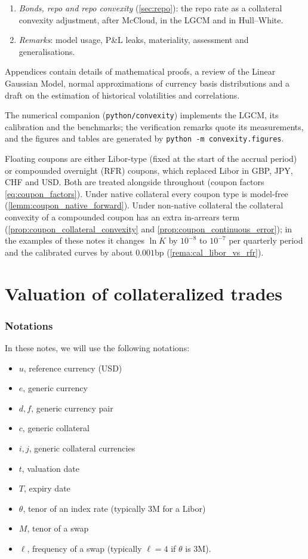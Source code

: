 \documentclass[11pt,english]{amsart}
\theoremstyle{definition}
\begin{document}
\begin{enumerate}
\item \emph{Bonds, repo and repo convexity} (\autoref{sec:repo}): the repo rate as a collateral convexity adjustment, after McCloud, in the LGCM and in Hull--White.
\item \emph{Remarks}: model usage, P\&L leaks, materiality, assessment and generalisations.
\end{enumerate}

Appendices contain details of mathematical proofs, a review of the Linear Gaussian Model, normal approximations of currency basis distributions and a draft on the estimation of historical volatilities and correlations.

The numerical companion (\texttt{python/convexity}) implements the LGCM, its calibration and the benchmarks; the verification remarks quote its measurements, and the figures and tables are generated by \texttt{python -m convexity.figures}.

Floating coupons are either Libor-type (fixed at the start of the accrual period) or compounded overnight (RFR) coupons, which replaced Libor in GBP, JPY, CHF and USD. Both are treated alongside throughout (coupon factors \eqref{eq:coupon_factors}). Under native collateral every coupon type is model-free (\autoref{lemm:coupon_native_forward}). Under non-native collateral the collateral convexity of a compounded coupon has an extra in-arrears term (\autoref{prop:coupon_collateral_convexity} and \autoref{prop:coupon_continuous_error}); in the examples of these notes it changes $\ln K$ by $10^{-8}$ to $10^{-7}$ per quarterly period and the calibrated curves by about $0.001$bp (\autoref{rema:cal_libor_vs_rfr}).

\newpage
\section{Valuation of collateralized trades}%


\subsubsection*{Notations}%
In these notes, we will use the following notations:
\begin{itemize}
\item $u$, reference currency (USD)
\item $e$, generic currency
\item $d,f$, generic currency pair
\item $c$, generic collateral
\item $i,j$, generic collateral currencies
\item $t$, valuation date
\item $T$, expiry date  
\item $\theta$, tenor of an index rate (typically 3M for a Libor)
\item $M$, tenor of a swap
\item $\ell$, frequency of a swap (typically $\ell = 4$ if $\theta$ is 3M). 
\end{itemize}
\end{document}
